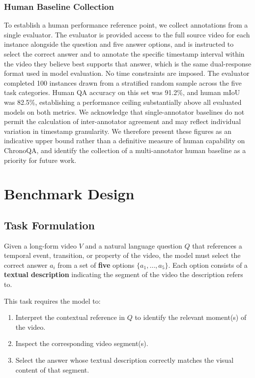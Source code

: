 \documentclass[sigconf,natbib=false,nonacm]{acmart}
\begin{document}
\subsubsection{Human Baseline Collection}
To establish a human performance reference point, we collect annotations from a single evaluator. The evaluator is provided access to the full source video for each instance alongside the question and five answer options, and is instructed to select the correct answer and to annotate the specific timestamp interval within the video they believe best supports that answer, which is the same dual-response format used in model evaluation. No time constraints are imposed. The evaluator completed 100 instances drawn from a stratified random sample across the five task categories. Human QA accuracy on this set was 91.2\%, and human mIoU was 82.5\%, establishing a performance ceiling substantially above all evaluated models on both metrics. We acknowledge that single-annotator baselines do not permit the calculation of inter-annotator agreement and may reflect individual variation in timestamp granularity. We therefore present these figures as an indicative upper bound rather than a definitive measure of human capability on ChronoQA, and identify the collection of a multi-annotator human baseline as a priority for future work.

\section{Benchmark Design}

\subsection{Task Formulation}

Given a long-form video $V$ and a natural language question $Q$ that references a temporal event, transition, or property of the video, the model must select the correct answer $a_{i}$ from a set of \textbf{five} options $\{a_1, \ldots, a_5\}$. Each option consists of a \textbf{textual description} indicating the segment of the video the description refers to.

This task requires the model to:
\begin{enumerate}
  \item Interpret the contextual reference in $Q$ to identify the relevant moment(s) of the video.
  \item Inspect the corresponding video segment(s).
  \item Select the answer whose textual description correctly matches the visual content of that segment.
\end{enumerate}
\end{document}
